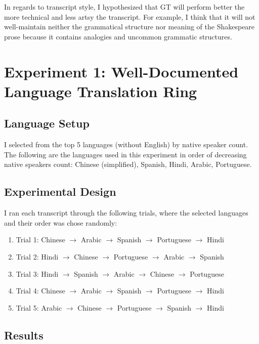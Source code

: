 \documentclass{article}
\newcommand{\forcenewpage}{\clearpage \newpage}
\begin{document}
In regards to transcript style, I hypothesized that GT will perform better the more technical and less artsy the transcript. For example, I think that it will not well-maintain neither the grammatical structure nor meaning of the Shakespeare prose because it contains analogies and uncommon grammatic structures.



\section{Experiment 1: Well-Documented Language Translation Ring}\subsection{Language Setup}


I selected from the top 5 languages (without English) by native speaker count. The following are the languages used in this experiment in order of decreasing native speakers count: Chinese (simplified), Spanish, Hindi, Arabic, Portuguese.


\subsection{Experimental Design}


I ran each transcript through the following trials, where the selected languages and their order was chose randomly:
\begin{enumerate}
\item[] Trial 1: Chinese $\rightarrow$ Arabic $\rightarrow$ Spanish $\rightarrow$ Portuguese $\rightarrow$ Hindi
\item[] Trial 2: Hindi $\rightarrow$ Chinese $\rightarrow$ Portuguese $\rightarrow$ Arabic $\rightarrow$ Spanish
\item[] Trial 3: Hindi $\rightarrow$ Spanish $\rightarrow$ Arabic $\rightarrow$ Chinese $\rightarrow$ Portuguese
\item[] Trial 4: Chinese $\rightarrow$ Arabic $\rightarrow$ Spanish $\rightarrow$ Portuguese $\rightarrow$ Hindi
\item[] Trial 5: Arabic $\rightarrow$ Chinese $\rightarrow$ Portuguese $\rightarrow$ Spanish $\rightarrow$ Hindi
\end{enumerate}


\subsection{Results}
\end{document}
